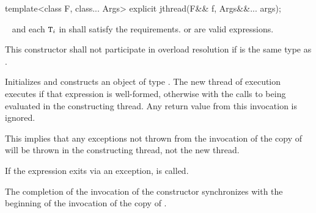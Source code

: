 %
\begin{itemdecl}
template<class F, class... Args> explicit jthread(F&& f, Args&&... args);
\end{itemdecl}
\begin{itemdescr}
  \pnum
\requires\  and each $\texttt{T}_i$ in  shall satisfy the
 requirements.
{\color{diffcolor}
        or
}
 are valid expressions.

\pnum\remarks
This constructor shall not participate in overload resolution if 
is the same type as .

\pnum\effects
{\color{diffcolor} Initializes  and
}
constructs an object of type .
The new thread of execution executes
{\color{diffcolor}
if that expression is well-formed,
otherwise
}
with the calls to
 being evaluated in the constructing thread.
Any return value from this invocation is ignored.
\begin{note} This implies that any exceptions not thrown from the invocation of the copy
of  will be thrown in the constructing thread, not the new thread. \end{note}
{\color{diffcolor}
If the  expression
exits via an exception,  is called.
}

\pnum\sync The completion of the invocation of the constructor
synchronizes with the beginning of the invocation of the copy of .


\end{itemdescr}
